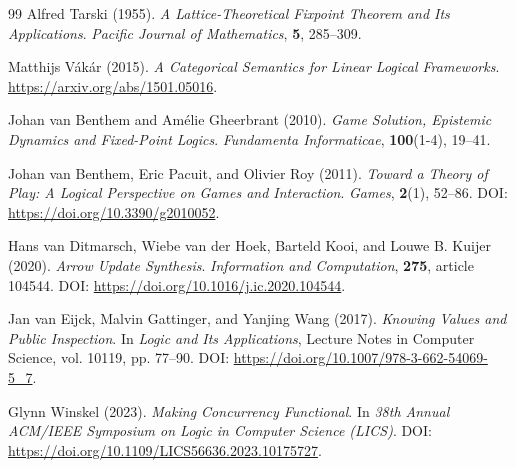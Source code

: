 \documentclass[11pt,a4paper]{article}
\numberwithin{equation}{section}
\theoremstyle{definition}
\theoremstyle{remark}
\theoremstyle{plain}
\begin{document}
\begin{thebibliography}{99}
Alfred Tarski (1955).
\newblock \emph{A Lattice-Theoretical Fixpoint Theorem and Its Applications}.
\newblock \emph{Pacific Journal of Mathematics}, \textbf{5}, 285--309.

Matthijs Vákár (2015).
\newblock \emph{A Categorical Semantics for Linear Logical Frameworks}.
\newblock \url{https://arxiv.org/abs/1501.05016}.

Johan van Benthem and Amélie Gheerbrant (2010).
\newblock \emph{Game Solution, Epistemic Dynamics and Fixed-Point Logics}.
\newblock \emph{Fundamenta Informaticae}, \textbf{100}(1-4), 19--41.

Johan van Benthem, Eric Pacuit, and Olivier Roy (2011).
\newblock \emph{Toward a Theory of Play: A Logical Perspective on Games and Interaction}.
\newblock \emph{Games}, \textbf{2}(1), 52--86.
\newblock DOI: \url{https://doi.org/10.3390/g2010052}.

Hans van Ditmarsch, Wiebe van der Hoek, Barteld Kooi, and Louwe B. Kuijer (2020).
\newblock \emph{Arrow Update Synthesis}.
\newblock \emph{Information and Computation}, \textbf{275}, article 104544.
\newblock DOI: \url{https://doi.org/10.1016/j.ic.2020.104544}.

Jan van Eijck, Malvin Gattinger, and Yanjing Wang (2017).
\newblock \emph{Knowing Values and Public Inspection}.
\newblock In \emph{Logic and Its Applications}, Lecture Notes in Computer Science, vol. 10119, pp. 77--90.
\newblock DOI: \url{https://doi.org/10.1007/978-3-662-54069-5_7}.

Glynn Winskel (2023).
\newblock \emph{Making Concurrency Functional}.
\newblock In \emph{38th Annual ACM/IEEE Symposium on Logic in Computer Science (LICS)}.
\newblock DOI: \url{https://doi.org/10.1109/LICS56636.2023.10175727}.

\end{thebibliography}
\end{document}
